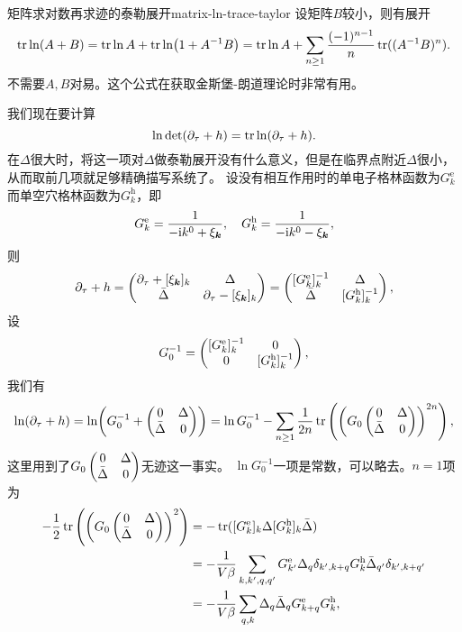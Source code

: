 \begin{back}{矩阵求对数再求迹的泰勒展开}{matrix-ln-trace-taylor}
    设矩阵$B$较小，则有展开
    \begin{equation}
        \trace \ln(A+B) = \trace \ln A + \trace \ln (1 + A^{-1} B) = \trace \ln A + \sum_{n \geq 1} \frac{(-1)^{n-1}}{n} \trace((A^{-1} B)^n).
    \end{equation}
    不需要$A, B$对易。这个公式在获取金斯堡-朗道理论时非常有用。
\end{back}

我们现在要计算
\[
    \ln \det (\partial_\tau + h) = \trace \ln (\partial_\tau + h).
\]
在$\Delta$很大时，将这一项对$\Delta$做泰勒展开没有什么意义，但是在临界点附近$\Delta$很小，从而取前几项就足够精确描写系统了。
设没有相互作用时的单电子格林函数为$G_{k}^\text{e}$而单空穴格林函数为$G_{k}^\text{h}$，即
\begin{equation}
    G_{k}^\text{e} = \frac{1}{- \mathrm{i} k^0 + \xi_{\vb*{k}}}, \quad G_{k}^\text{h} = \frac{1}{- \mathrm{i} k^0 - \xi_{\vb*{k}}},
\end{equation}
则
\[
    \partial_\tau + h = \pmqty{ \partial_\tau + [\xi_{\vb*{k}}]_{k} & \Delta \\ \bar{\Delta} & \partial_\tau - [\xi_{\vb*{k}}]_{k} } = \pmqty{ [G_{k}^\text{e}]_{k}^{-1} & \Delta \\ \bar{\Delta} & [G_{k}^\text{h}]_{k}^{-1} },
\]
设
\begin{equation}
    G_0^{-1} = \pmqty{ [G_{k}^\text{e}]_{k}^{-1} & 0 \\ 0 & [G_{k}^\text{h}]_{k}^{-1} },
\end{equation}
我们有
\begin{equation}
    \ln (\partial_\tau + h) = \ln(G_0^{-1} + \pmqty{0 & \Delta \\ \bar{\Delta} & 0}) = \ln G_0^{-1} - \sum_{n \geq 1} \frac{1}{2n} \trace\left(\left(G_0 \pmqty{0 & \Delta \\ \bar{\Delta} & 0} \right)^{2n}\right),
    \label{eq:bcs-kernal-expansion}
\end{equation}
这里用到了$G_0 \pmqty{0 & \Delta \\ \bar{\Delta} & 0}$无迹这一事实。
$\ln G_0^{-1}$一项是常数，可以略去。$n=1$项为
\[
    \begin{aligned}
        - \frac{1}{2} \trace\left(\left(G_0 \pmqty{0 & \Delta \\ \bar{\Delta} & 0} \right)^{2}\right) &= - \trace([G^\text{e}_{k}]_{k} \Delta [G^\text{h}_{k}]_{k} \bar{\Delta}) \\
        &= - \frac{1}{V \beta} \sum_{k, k', q, q'} G^\text{e}_{k'} \Delta_{q} \delta_{k', k + q} G^\text{h}_k \bar{\Delta}_{q'} \delta_{k', k + q'} \\
        &= - \frac{1}{V \beta} \sum_{q, k} \Delta_{q} \bar{\Delta}_q G^\text{e}_{k+q} G^\text{h}_k,
    \end{aligned}
\]

